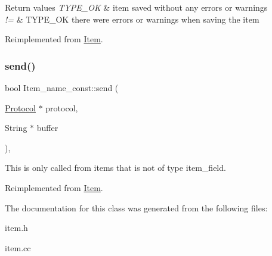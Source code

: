 \begin{DoxyRetVals}{Return values}
{\em T\+Y\+P\+E\+\_\+\+OK} & item saved without any errors or warnings \\
\hline
{\em !=} & T\+Y\+P\+E\+\_\+\+OK there were errors or warnings when saving the item \\
\hline
\end{DoxyRetVals}


Reimplemented from \mbox{\hyperlink{classItem_a463ded5f3c21ed2508dd8fddc6024722}{Item}}.

\mbox{\label{classItem__name__const_a11b5077653b428797e7f9ca7e5237eec}} 
\subsubsection{\texorpdfstring{send()}{send()}}
{\footnotesize\ttfamily bool Item\+\_\+name\+\_\+const\+::send (\begin{DoxyParamCaption}\item[{\mbox{\hyperlink{classProtocol}{Protocol}} $\ast$}]{protocol,  }\item[{String $\ast$}]{buffer }\end{DoxyParamCaption})\hspace{0.3cm}{\ttfamily [inline]}, {\ttfamily [virtual]}}

This is only called from items that is not of type item\+\_\+field. 

Reimplemented from \mbox{\hyperlink{classItem_a7d1b934e9612e1c78bd369b31e3d9cb1}{Item}}.



The documentation for this class was generated from the following files\+:\begin{DoxyCompactItemize}
\item 
item.\+h\item 
item.\+cc\end{DoxyCompactItemize}
